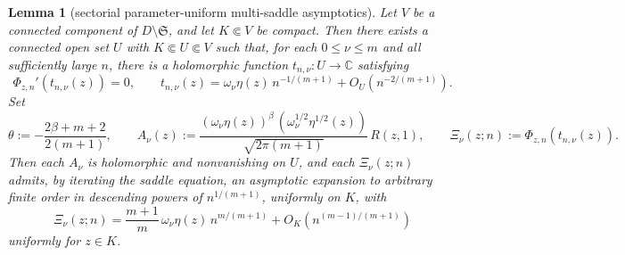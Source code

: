 \documentclass[10pt,a4paper]{amsart}
\newtheorem{lem}{Lemma}
\newcommand{\C}{\mathbb C}
\begin{document}
\begin{lem}[sectorial parameter-uniform multi-saddle asymptotics]\label{lem:wright-multi}
Let $V$ be a connected component of $D\setminus\mathfrak S$, and let $K\Subset V$ be compact. Then there exists a connected open set $U$ with $K\Subset U\Subset V$ such that, for each $0\le\nu\le m$ and all sufficiently large $n$, there is a holomorphic function $t_{n,\nu}:U\to\C$ satisfying
$$\Phi_{z,n}'(t_{n,\nu}(z))=0,\qquad
t_{n,\nu}(z)=\omega_\nu\eta(z)\,n^{-1/(m+1)}+O_U\!\left(n^{-2/(m+1)}\right).$$
Set
\begin{equation}\label{eq:wright-multi-data}
\theta:=-\frac{2\beta+m+2}{2(m+1)},\qquad
A_\nu(z):=\frac{(\omega_\nu\eta(z))^{\beta}\,(\omega_\nu^{1/2}\eta^{1/2}(z))}{\sqrt{2\pi(m+1)}}\,R(z,1),
\qquad
\Xi_\nu(z;n):=\Phi_{z,n}(t_{n,\nu}(z)).
\end{equation}
Then each $A_\nu$ is holomorphic and nonvanishing on $U$, and each $\Xi_\nu(z;n)$ admits, by iterating the saddle equation, an asymptotic expansion to arbitrary finite order in descending powers of $n^{1/(m+1)}$, uniformly on $K$, with
\begin{equation}\label{eq:wright-multi-phase}
\Xi_\nu(z;n)=\frac{m+1}{m}\,\omega_\nu\eta(z)\,n^{m/(m+1)}
+O_K\!\left(n^{(m-1)/(m+1)}\right)
\end{equation}
uniformly for $z\in K$.


\end{lem}
\end{document}
